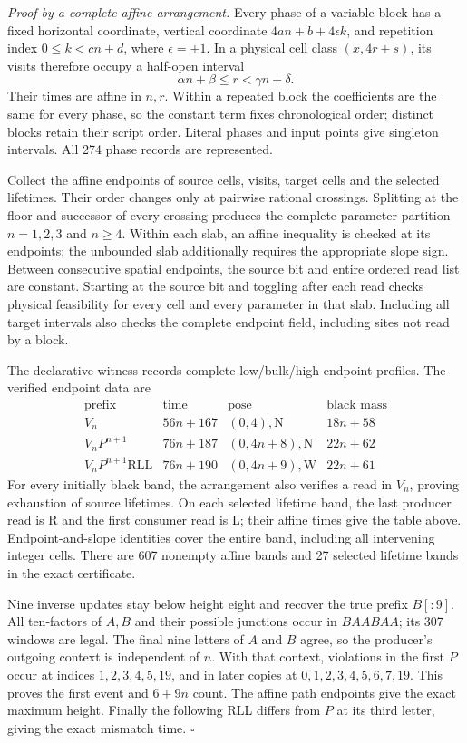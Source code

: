 \textit{Proof by a complete affine arrangement.}
Every phase of a variable block has a fixed horizontal coordinate, vertical
coordinate \(4an+b+4\epsilon k\), and repetition index
\(0\le k<cn+d\), where \(\epsilon=\pm1\). In a physical cell class
\((x,4r+s)\), its visits therefore occupy a half-open interval
\[
 \alpha n+\beta\le r<\gamma n+\delta.
\]
Their times are affine in \(n,r\). Within a repeated block the coefficients
are the same for every phase, so the constant term fixes chronological
order; distinct blocks retain their script order. Literal phases and input
points give singleton intervals. All 274 phase records are represented.

Collect the affine endpoints of source cells, visits, target cells and the
selected lifetimes. Their order changes only at pairwise rational crossings.
Splitting at the floor and successor of every crossing produces the complete
parameter partition \(n=1,2,3\) and \(n\ge4\). Within each slab, an affine
inequality is checked at its endpoints; the unbounded slab additionally
requires the appropriate slope sign. Between consecutive spatial endpoints,
the source bit and entire ordered read list are constant. Starting at the
source bit and toggling after each read checks physical feasibility for every
cell and every parameter in that slab. Including all target intervals also
checks the complete endpoint field, including sites not read by a block.

The declarative witness records complete low/bulk/high endpoint profiles.
The verified endpoint data are
\[
\begin{array}{c|c|c|c}
\text{prefix}&\text{time}&\text{pose}&\text{black mass}\\\hline
V_n&56n+167&(0,4),\mathrm N&18n+58\\
V_nP^{n+1}&76n+187&(0,4n+8),\mathrm N&22n+62\\
V_nP^{n+1}\mathrm{RLL}&76n+190&(0,4n+9),\mathrm W&22n+61
\end{array}
\]
For every initially black band, the arrangement also verifies a read in
\(V_n\), proving exhaustion of source lifetimes. On each selected lifetime
band, the last producer read is R and the first consumer read is L; their
affine times give the table above. Endpoint-and-slope identities cover the
entire band, including all intervening integer cells. There are 607 nonempty
affine bands and 27 selected lifetime bands in the exact certificate.

Nine inverse updates stay below height eight and recover the true prefix
\(B[:9]\). All ten-factors of \(A,B\) and their possible junctions occur
in \(BAABAA\); its 307 windows are legal. The final nine letters of \(A\)
and \(B\) agree, so the producer's outgoing context is independent of
\(n\). With that context, violations in the first \(P\) occur at indices
\(1,2,3,4,5,19\), and in later copies at
\(0,1,2,3,4,5,6,7,19\). This proves the first event and \(6+9n\) count.
The affine path endpoints give the exact maximum height. Finally the
following RLL differs from \(P\) at its third letter, giving the exact
mismatch time. \(\square\)


